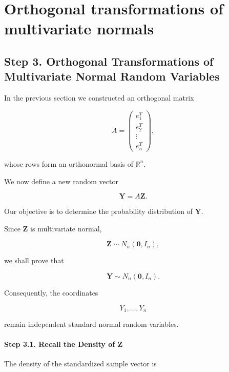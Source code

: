 \documentclass[11pt]{article}
\begin{document}
	\section{Orthogonal transformations of multivariate normals}
	\begin{mdframed}[
		linewidth=0.8pt,
		roundcorner=6pt,
		backgroundcolor=gray!5,
		linecolor=gray!60,
		innertopmargin=10pt,
		innerbottommargin=10pt,
		innerleftmargin=10pt,
		innerrightmargin=10pt
		]
		
		\subsection*{Step 3. Orthogonal Transformations of Multivariate Normal Random Variables}
		
		In the previous section we constructed an orthogonal matrix
		
		\[
		A
		=
		\begin{pmatrix}
			e_1^T\\
			e_2^T\\
			\vdots\\
			e_n^T
		\end{pmatrix},
		\]
		
		whose rows form an orthonormal basis of $\mathbb R^n$.
		
		We now define a new random vector
		
		\[
		\boxed{
			\mathbf Y
			=
			A\mathbf Z.
		}
		\]
		
		Our objective is to determine the probability distribution of
		$\mathbf Y$.
		
		Since $\mathbf Z$ is multivariate normal,
		
		\[
		\mathbf Z
		\sim
		N_n(\mathbf0,I_n),
		\]
		
		we shall prove that
		
		\[
		\boxed{
			\mathbf Y
			\sim
			N_n(\mathbf0,I_n).
		}
		\]
		
		Consequently, the coordinates
		
		\[
		Y_1,\ldots,Y_n
		\]
		
		remain independent standard normal random variables.
		
		\paragraph{Step 3.1. Recall the Density of $\mathbf Z$}
		
		The density of the standardized sample vector is
		

\end{mdframed}
\end{document}
